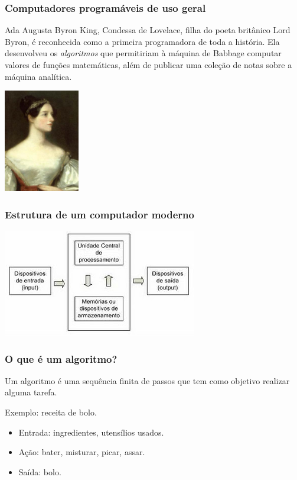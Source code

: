 \documentclass[hyperref={pdfpagelabels=false}]{beamer}
\begin{document}
\begin{frame}
   \frametitle{Computadores programáveis de uso geral}
   Ada Augusta Byron King, Condessa de Lovelace, filha do poeta britânico Lord Byron, é reconhecida como a primeira programadora de toda a história. Ela desenvolveu os \emph{algoritmos} que permitiriam à máquina de Babbage computar valores de funções matemáticas, além de publicar uma coleção de notas sobre a máquina analítica.
	\begin{center}
		\includegraphics[height=4.5cm]{img/ada.jpeg}
	\end{center}
\end{frame}
\begin{frame}
   \frametitle{Estrutura de um computador moderno}
   \begin{center}
      \includegraphics{img/cpu.jpg}
   \end{center}
\end{frame}
\begin{frame}
	\frametitle{O que é um algoritmo?}
   \begin{center}
      Um algoritmo é uma sequência \alert{finita} de passos que tem como objetivo realizar alguma tarefa.
   \end{center}

	Exemplo: receita de bolo.
   \begin{itemize}
		\item Entrada: ingredientes, utensílios usados.
		\item Ação: bater, misturar, picar, assar.
		\item Saída: bolo.
	\end{itemize}
\end{frame}
\end{document}

